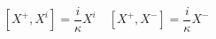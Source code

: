 \begin{equation}\label{10}
\left[X^{+},X^{i}\right]=\frac{i}{\kappa}X^i\quad
\left[X^{+},X^{-}\right]=\frac{i}{\kappa}X^-
\end{equation}


